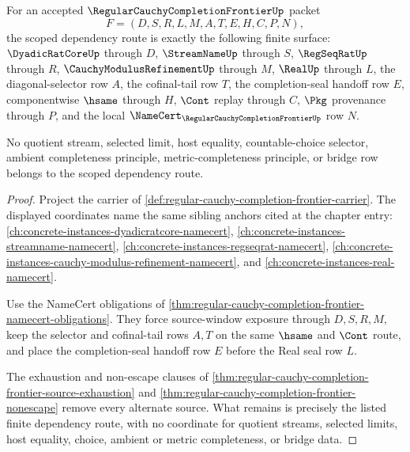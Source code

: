 \begin{theorem}
\label{thm:regular-cauchy-completion-frontier-scoped-dependency-route}
For an accepted $\RegularCauchyCompletionFrontierUp$ packet
$$
F=(D,S,R,L,M,A,T,E,H,C,P,N),
$$
the scoped dependency route is exactly the following finite surface: $\DyadicRatCoreUp$ through $D$, $\StreamNameUp$ through $S$, $\RegSeqRatUp$ through $R$, $\CauchyModulusRefinementUp$ through $M$, $\RealUp$ through $L$, the diagonal-selector row $A$, the cofinal-tail row $T$, the completion-seal handoff row $E$, componentwise $\hsame$ through $H$, $\Cont$ replay through $C$, $\Pkg$ provenance through $P$, and the local $\NameCert_{\RegularCauchyCompletionFrontierUp}$ row $N$.

No quotient stream, selected limit, host equality, countable-choice selector, ambient completeness principle, metric-completeness principle, or bridge row belongs to the scoped dependency route.
\end{theorem}
\begin{proof}
Project the carrier of \autoref{def:regular-cauchy-completion-frontier-carrier}. The displayed coordinates name the same sibling anchors cited at the chapter entry: \autoref{ch:concrete-instances-dyadicratcore-namecert}, \autoref{ch:concrete-instances-streamname-namecert}, \autoref{ch:concrete-instances-regseqrat-namecert}, \autoref{ch:concrete-instances-cauchy-modulus-refinement-namecert}, and \autoref{ch:concrete-instances-real-namecert}.

Use the NameCert obligations of \autoref{thm:regular-cauchy-completion-frontier-namecert-obligations}. They force source-window exposure through $D,S,R,M$, keep the selector and cofinal-tail rows $A,T$ on the same $\hsame$ and $\Cont$ route, and place the completion-seal handoff row $E$ before the Real seal row $L$.

The exhaustion and non-escape clauses of \autoref{thm:regular-cauchy-completion-frontier-source-exhaustion} and \autoref{thm:regular-cauchy-completion-frontier-nonescape} remove every alternate source. What remains is precisely the listed finite dependency route, with no coordinate for quotient streams, selected limits, host equality, choice, ambient or metric completeness, or bridge data.
\end{proof}

